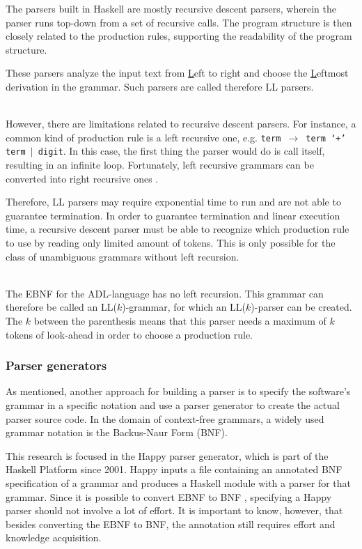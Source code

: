 The parsers built in Haskell are mostly recursive descent parsers, wherein the parser runs top-down from a set of recursive calls.
The program structure is then closely related to the production rules, supporting the readability of the program structure.

These parsers analyze the input text from \underline{L}eft to right and choose the \underline{L}eftmost derivation in the grammar.
Such parsers are called therefore LL parsers.

~\\
However, there are limitations related to recursive descent parsers.
For instance, a common kind of production rule is a left recursive one, e.g. \texttt{term $\rightarrow$ term `$+$' term $|$ digit}.
In this case, the first thing the parser would do is call itself, resulting in an infinite loop.
Fortunately, left recursive grammars can be converted into right recursive ones .

Therefore, LL parsers may require exponential time to run and are not able to guarantee termination.
In order to guarantee termination and linear execution time, a recursive descent parser must be able to recognize which production rule to use by reading only limited amount of tokens.
This is only possible for the class of unambiguous grammars without left recursion.

~\\
%
%
The EBNF for the ADL-language has no left recursion.
This grammar can therefore be called an LL($k$)-grammar, for which an LL($k$)-parser can be created.
The $k$ between the parenthesis means that this parser needs a maximum of $k$ tokens of look-ahead in order to choose a production rule.

\subsubsection{Parser generators}
As mentioned, another approach for building a parser is to specify the software's grammar in a specific notation and use a parser generator to create the actual parser source code.
In the domain of context-free grammars, a widely used grammar notation is the Backus-Naur Form (BNF).

%
This research is focused in the Happy parser generator, which is part of the Haskell Platform since 2001.
Happy inputs a file containing an annotated BNF specification of a grammar and produces a Haskell module with a parser for that grammar.
Since it is possible to convert EBNF to BNF , specifying a Happy parser should not involve a lot of effort.
It is important to know, however, that besides converting the EBNF to BNF, the annotation still requires effort and knowledge acquisition.

